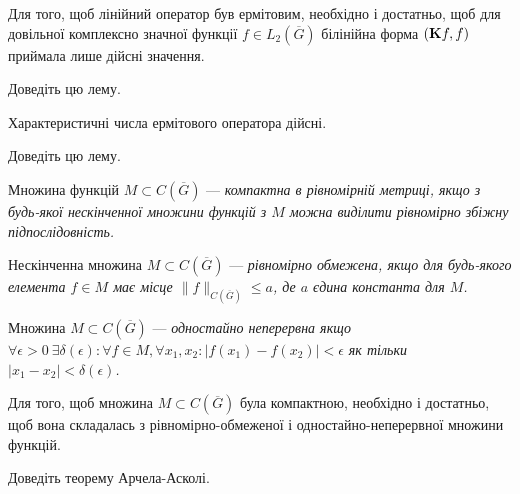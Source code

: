\begin{lemma}
	Для того, щоб лінійний оператор був ермітовим, необхідно і достатньо, щоб для довільної комплексно значної функції $f \in L_2\left(\overline G\right)$ білінійна форма $(\bf{K}f, f)$ приймала лише дійсні значення.
\end{lemma}

\begin{exercise}
	Доведіть цю лему.
\end{exercise}

\begin{lemma}
	Характеристичні числа ермітового оператора дійсні.
\end{lemma}

\begin{exercise}
	Доведіть цю лему.
\end{exercise}

\begin{definition}
	Множина функцій $M \subset C\left(\overline G\right)$ --- \it{компактна в рівномірній метриці}, якщо з будь-якої нескінченної множини функцій з $M$ можна виділити рівномірно збіжну підпослідовність.
\end{definition}

\begin{definition}
	Нескінченна множина $M \subset C\left(\overline G\right)$ --- \it{рівномірно обмежена}, якщо для будь-якого елемента $f \in M$ має місце $\|f\|_{C(\overline G)} \le a$, де $a$ єдина константа для $M$.
\end{definition}

\begin{definition}
	Множина $M \subset C\left(\overline G\right)$ --- \it{одностайно неперервна} якщо $\forall \epsilon >0  \:\exists \delta(\epsilon): \forall f \in M, \forall x_1, x_2: |f(x_1) - f(x_2)| < \epsilon$ як тільки $|x_1 - x_2| < \delta(\epsilon)$.
\end{definition}

\begin{theorem}
	Для того, щоб множина $M \subset C\left(\overline G\right)$ була компактною, необхідно і достатньо, щоб вона складалась з рівномірно-обмеженої і одностайно-неперервної множини функцій.
\end{theorem}

\begin{sproblem}
	Доведіть теорему Арчела-Асколі.
\end{sproblem}

